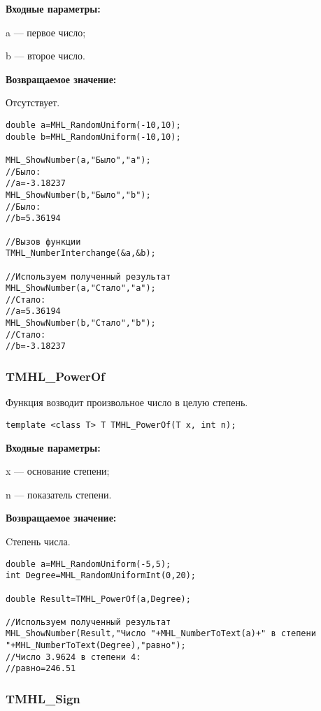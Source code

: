 \documentclass[a4paper,12pt]{article}
\begin{document}
\textbf{Входные параметры:}

 a --- первое число;
 
 b --- второе число.

\textbf{Возвращаемое значение:}

 Отсутствует.


\begin{lstlisting}[label=code_use_TMHL_NumberInterchange,caption=Пример использования]
double a=MHL_RandomUniform(-10,10);
double b=MHL_RandomUniform(-10,10);

MHL_ShowNumber(a,"Было","a");
//Было:
//a=-3.18237
MHL_ShowNumber(b,"Было","b");
//Было:
//b=5.36194

//Вызов функции
TMHL_NumberInterchange(&a,&b);

//Используем полученный результат
MHL_ShowNumber(a,"Стало","a");
//Стало:
//a=5.36194
MHL_ShowNumber(b,"Стало","b");
//Стало:
//b=-3.18237
\end{lstlisting}

\subsubsection{TMHL\_PowerOf}\label{TMHL_PowerOf}

Функция возводит произвольное число в целую степень.


\begin{lstlisting}[label=code_syntax_TMHL_PowerOf,caption=Синтаксис]
template <class T> T TMHL_PowerOf(T x, int n);
\end{lstlisting}

\textbf{Входные параметры:}  
 
x --- основание степени;
 
n --- показатель степени.

\textbf{Возвращаемое значение:}

Cтепень числа.


\begin{lstlisting}[label=code_use_TMHL_PowerOf,caption=Пример использования]
double a=MHL_RandomUniform(-5,5);
int Degree=MHL_RandomUniformInt(0,20);

double Result=TMHL_PowerOf(a,Degree);

//Используем полученный результат
MHL_ShowNumber(Result,"Число "+MHL_NumberToText(a)+" в степени "+MHL_NumberToText(Degree),"равно");
//Число 3.9624 в степени 4:
//равно=246.51
\end{lstlisting}

\subsubsection{TMHL\_Sign}\label{TMHL_Sign}
\end{document}
